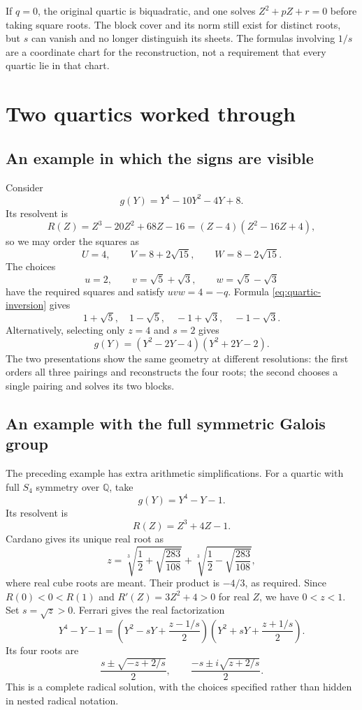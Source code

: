 \documentclass[11pt]{article}
\theoremstyle{remark}
\newcommand{\Q}{\mathbb Q}
\begin{document}
If \(q=0\), the original quartic is biquadratic, and one solves \(Z^2+pZ+r=0\) before taking square roots. The block cover and its norm still exist for distinct roots, but \(s\) can vanish and no longer distinguish its sheets. The formulas involving \(1/s\) are a coordinate chart for the reconstruction, not a requirement that every quartic lie in that chart.

\section{Two quartics worked through}

\subsection{An example in which the signs are visible}

Consider
\[
g(Y)=Y^4-10Y^2-4Y+8.
\]
Its resolvent is
\[
R(Z)=Z^3-20Z^2+68Z-16=(Z-4)(Z^2-16Z+4),
\]
so we may order the squares as
\[
U=4,\qquad V=8+2\sqrt{15},\qquad W=8-2\sqrt{15}.
\]
The choices
\[
u=2,\qquad v=\sqrt5+\sqrt3,\qquad w=\sqrt5-\sqrt3
\]
have the required squares and satisfy \(uvw=4=-q\). Formula \eqref{eq:quartic-inversion} gives
\[
1+\sqrt5,\quad 1-\sqrt5,\quad -1+\sqrt3,\quad -1-\sqrt3.
\]
Alternatively, selecting only \(z=4\) and \(s=2\) gives
\[
g(Y)=(Y^2-2Y-4)(Y^2+2Y-2).
\]
The two presentations show the same geometry at different resolutions: the first orders all three pairings and reconstructs the four roots; the second chooses a single pairing and solves its two blocks.

\subsection{An example with the full symmetric Galois group}

The preceding example has extra arithmetic simplifications. For a quartic with full \(S_4\) symmetry over \(\Q\), take
\[
g(Y)=Y^4-Y-1.
\]
Its resolvent is
\[
R(Z)=Z^3+4Z-1.
\]
Cardano gives its unique real root as
\begin{equation}
z=\sqrt[3]{\frac12+\sqrt{\frac{283}{108}}}
 +\sqrt[3]{\frac12-\sqrt{\frac{283}{108}}},
\label{eq:s4-example}
\end{equation}
where real cube roots are meant. Their product is \(-4/3\), as required. Since \(R(0)<0<R(1)\) and \(R'(Z)=3Z^2+4>0\) for real \(Z\), we have \(0<z<1\). Set \(s=\sqrt z>0\). Ferrari gives the real factorization
\[
Y^4-Y-1=
\left(Y^2-sY+\frac{z-1/s}{2}\right)
\left(Y^2+sY+\frac{z+1/s}{2}\right).
\]
Its four roots are
\[
\frac{s\pm\sqrt{-z+2/s}}{2},\qquad
\frac{-s\pm i\sqrt{z+2/s}}{2}.
\]
This is a complete radical solution, with the choices specified rather than hidden in nested radical notation.
\end{document}
